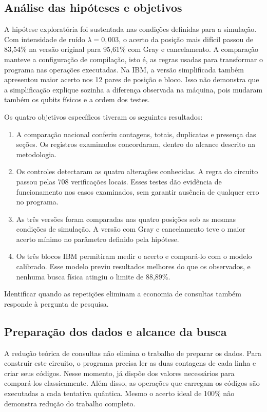 \subsection{Análise das hipóteses e objetivos}
A hipótese exploratória foi sustentada nas condições definidas para a simulação. Com intensidade de ruído $\lambda=0{,}003$, o acerto da posição mais difícil passou de 83,54\% na versão original para 95,61\% com Gray e cancelamento. A comparação manteve a configuração de compilação, isto é, as regras usadas para transformar o programa nas operações executadas. Na IBM, a versão simplificada também apresentou maior acerto nos 12 pares de posição e bloco. Isso não demonstra que a simplificação explique sozinha a diferença observada na máquina, pois mudaram também os qubits físicos e a ordem dos testes.

Os quatro objetivos específicos tiveram os seguintes resultados:
\begin{enumerate}
\item A comparação nacional conferiu contagens, totais, duplicatas e presença das seções. Os registros examinados concordaram, dentro do alcance descrito na metodologia.
\item Os controles detectaram as quatro alterações conhecidas. A regra do circuito passou pelas 708 verificações locais. Esses testes dão evidência de funcionamento nos casos examinados, sem garantir ausência de qualquer erro no programa.
\item As três versões foram comparadas nas quatro posições sob as mesmas condições de simulação. A versão com Gray e cancelamento teve o maior acerto mínimo no parâmetro definido pela hipótese.
\item Os três blocos IBM permitiram medir o acerto e compará-lo com o modelo calibrado. Esse modelo previu resultados melhores do que os observados, e nenhuma busca física atingiu o limite de 88,89\%.
\end{enumerate}
Identificar quando as repetições eliminam a economia de consultas também responde à pergunta de pesquisa.

\subsection{Preparação dos dados e alcance da busca}
A redução teórica de consultas não elimina o trabalho de preparar os dados. Para construir este circuito, o programa precisa ler as duas contagens de cada linha e criar seus códigos. Nesse momento, já dispõe dos valores necessários para compará-los classicamente. Além disso, as operações que carregam os códigos são executadas a cada tentativa quântica. Mesmo o acerto ideal de 100\% não demonstra redução do trabalho completo.

